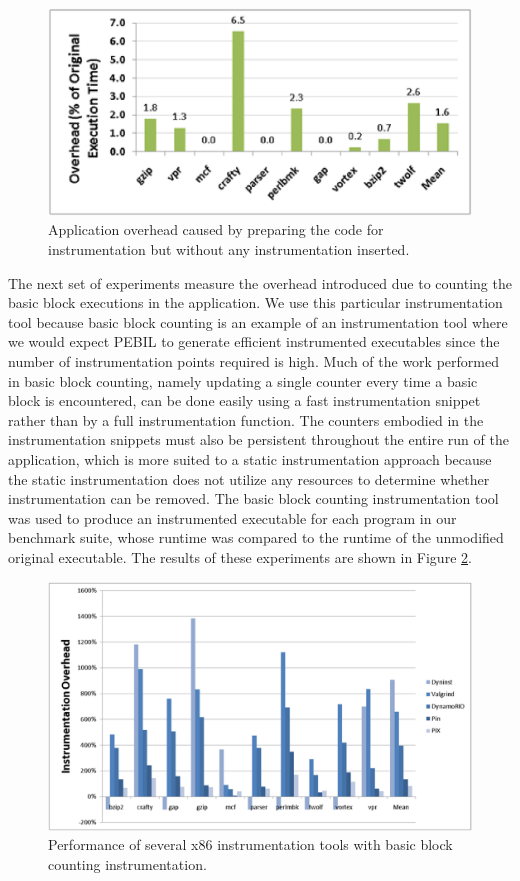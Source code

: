 \begin{figure}[ht]
\centering
\label{fig:RelocOverhead}
\includegraphics[scale=0.6]{relocperf.eps}
\caption{Application overhead caused by preparing the code for instrumentation but without
any instrumentation inserted.}
\end{figure}

The next set of experiments measure the overhead introduced due to counting the
basic block executions in the application. We use this particular
instrumentation tool because basic block counting is an example of an
instrumentation tool where we would expect PEBIL to generate efficient
instrumented executables since the number of instrumentation points required is
high. Much of the work performed in basic block counting, namely updating a
single counter every time a basic block is encountered, can be done easily using
a fast instrumentation snippet rather than by a full instrumentation function.
The counters embodied in the instrumentation snippets must also be persistent
throughout the entire run of the application, which is more suited to a static
instrumentation approach because the static instrumentation does not utilize any
resources to determine whether instrumentation can be removed. The basic block
counting instrumentation tool was used to produce an instrumented executable for
each program in our benchmark suite, whose runtime was compared to the runtime
of the unmodified original executable. The results of these experiments are
shown in Figure \ref{fig:ToolOverheads}. 

\begin{figure}[ht]
\centering
\label{fig:ToolOverheads}
\includegraphics[scale=0.32]{bbcount.eps}
\caption{Performance of several x86 instrumentation tools with basic block counting instrumentation.}
\end{figure}

